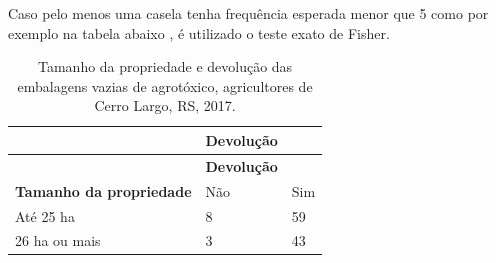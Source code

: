 \documentclass[12pt,brazil,oneside]{book}
\begin{document}
Caso pelo menos uma casela tenha frequência esperada menor que 5 como por exemplo na tabela abaixo , é utilizado o teste exato de Fisher.

\begin{longtable}[]{@{}lll@{}}
\caption{\label{tab:tamprop1}Tamanho da propriedade e devolução das embalagens vazias de agrotóxico, agricultores de Cerro Largo, RS, 2017.}\tabularnewline
\toprule
\begin{minipage}[b]{0.37\columnwidth}\raggedright
\strut
\end{minipage} & \begin{minipage}[b]{0.34\columnwidth}\raggedright
\textbf{Devolução}\strut
\end{minipage} & \begin{minipage}[b]{0.15\columnwidth}\raggedright
\strut
\end{minipage}\tabularnewline
\midrule
\endfirsthead
\toprule
\begin{minipage}[b]{0.37\columnwidth}\raggedright
\strut
\end{minipage} & \begin{minipage}[b]{0.34\columnwidth}\raggedright
\textbf{Devolução}\strut
\end{minipage} & \begin{minipage}[b]{0.15\columnwidth}\raggedright
\strut
\end{minipage}\tabularnewline
\midrule
\endhead
\begin{minipage}[t]{0.37\columnwidth}\raggedright
\textbf{Tamanho da propriedade}\strut
\end{minipage} & \begin{minipage}[t]{0.34\columnwidth}\raggedright
Não\strut
\end{minipage} & \begin{minipage}[t]{0.15\columnwidth}\raggedright
Sim\strut
\end{minipage}\tabularnewline
\begin{minipage}[t]{0.37\columnwidth}\raggedright
Até 25 ha\strut
\end{minipage} & \begin{minipage}[t]{0.34\columnwidth}\raggedright
8\strut
\end{minipage} & \begin{minipage}[t]{0.15\columnwidth}\raggedright
59\strut
\end{minipage}\tabularnewline
\begin{minipage}[t]{0.37\columnwidth}\raggedright
26 ha ou mais\strut
\end{minipage} & \begin{minipage}[t]{0.34\columnwidth}\raggedright
3\strut
\end{minipage} & \begin{minipage}[t]{0.15\columnwidth}\raggedright
43\strut
\end{minipage}\tabularnewline
\bottomrule
\end{longtable}
\end{document}
